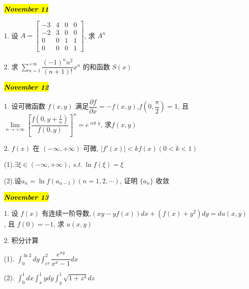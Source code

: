 \hl{\textbf{\textit{November 11}}}

1. 设 $ A=
\begin{bmatrix}
	-3 & 4 & 0 & 0 \\
	-2 & 3 & 0 & 0 \\
	 0 & 0 & 1 & 1 \\
	 0 & 0 & 0 & 1
\end{bmatrix}$, 求 $A^{n}$
\begin{solution}
	
\end{solution}

2. 求 $\displaystyle{\sum\limits_{n=1}^{+\infty}\dfrac{(-1)^{n}n^{2}}{(n+1)!}x^{n}}$ 的和函数 $S(x)$
\begin{solution}
	
\end{solution}

\hl{\textbf{\textit{November 12}}}

1. 设可微函数 $f(x,y)$ 满足$\dfrac{\partial f}{\partial x}=-f(x,y)$,$f(0,\dfrac{\pi}{2})=1$,
且 $\lim\limits_{n\rightarrow +\infty}\left[\dfrac{f(0,y+\frac{1}{n})}{f(0,y)} \right]^{n}=e^{\cot y} $, 求$f(x,y)$
\begin{solution}
	
\end{solution}

2. $f(x)$ 在 $(-\infty,+\infty)$ 可微, $|f'(x)|<kf(x)(0<k<1)$

(1).$\exists \xi\in(-\infty,+\infty),\ s.t.\ \ln f(\xi)=\xi$

(2).设$a_{n}=\ln f(a_{n-1})(n=1,2,\cdots)$, 证明 $\{a_{n}\}$ 收敛
\begin{solution}
	
\end{solution}

\hl{\textbf{\textit{November 13}}}

1. 设 $f(x)$ 有连续一阶导数,$(xy-yf(x))dx+(f(x)+y^2)dy=du(x,y)$, 且 $f(0)=-1$, 求 $u(x,y)$
\begin{solution}
	
\end{solution}

2. 积分计算

(1). $\displaystyle{\int_{0}^{\ln 2}dy\int_{e^{y}}^{2}\dfrac{e^{xy}}{x^{x}-1}dx}$

(2). $\displaystyle{\int_{0}^{1}dx\int_{x}^{1}ydy\int_{y}^{1}\sqrt{1+z^4}dz}$
\begin{solution}
	
\end{solution}

